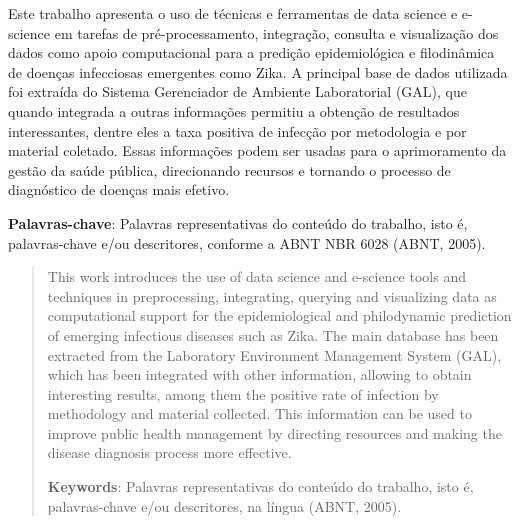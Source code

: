 \begin{resumo}

Este trabalho apresenta o uso de técnicas e ferramentas de data science e e-science em tarefas de pré-processamento, integração, consulta e visualização dos dados como apoio computacional para a predição epidemiológica e filodinâmica de doenças infecciosas emergentes como Zika. A principal base de dados utilizada foi extraída do Sistema Gerenciador de Ambiente Laboratorial (GAL), que quando integrada a outras informações permitiu a obtenção de resultados interessantes, dentre eles a taxa positiva de infecção por metodologia e por material coletado. Essas informações podem ser usadas para o aprimoramento da gestão da saúde pública, direcionando recursos e tornando o processo de diagnóstico de doenças mais efetivo.

{\hspace{-8mm} \bf{Palavras-chave}}: Palavras representativas do conteúdo do trabalho, isto é, palavras-chave e/ou descritores, conforme a ABNT NBR 6028 (ABNT, 2005).

\end{resumo}

\begin{abstract}

This work introduces the use of data science and e-science tools and techniques in preprocessing, integrating, querying and visualizing data as computational support for the epidemiological and philodynamic prediction of emerging infectious diseases such as Zika. The main database has been extracted from the Laboratory Environment Management System (GAL), which has been integrated with other information, allowing to obtain interesting results, among them the positive rate of infection by methodology and material collected. This information can be used to improve public health management by directing resources and making the disease diagnosis process more effective.

{\hspace{-8mm} \bf{Keywords}}: Palavras representativas do conteúdo do trabalho, isto é, palavras-chave e/ou descritores, na língua (ABNT, 2005).

\end{abstract}

